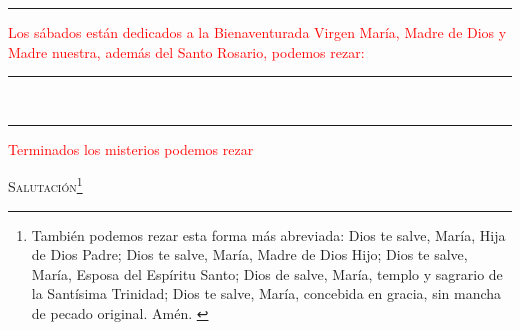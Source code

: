 \documentclass[10pt,twoside]{book}
\begin{document}
\begin{paracol}{2}
\begin{rightcolumn}
            
      \end{rightcolumn}

      \begin{leftcolumn*}
            

            
      \end{leftcolumn*}
      \begin{rightcolumn}
            

            
      \end{rightcolumn}
\end{paracol}

\iralfinal

\begin{center}
      {\rule{10em}{0.4pt}}

      \vspace{0.75em}

      \textcolor{red}{Los sábados están dedicados a la Bienaventurada Virgen María, Madre de Dios y Madre nuestra, 
      además del Santo Rosario, podemos rezar:}
\end{center}

\begin{multicols}{2}

      
      
\end{multicols}

\begin{center}
      \begin{spacing}{0.25}
            {\rule{20em}{0.4pt}}\\
            {\rule{20em}{0.4pt}}
      \end{spacing}
\end{center}

\vspace{-1em}
\label{final-prayer}
\begin{center}
      \textcolor{red}{Terminados los misterios podemos rezar}
      
      \vspace{1em}
      
      \textsc{Salutación}\footnote{También podemos rezar esta forma más abreviada: Dios te salve, María, Hija de Dios Padre; Dios te salve, María, Madre de Dios Hijo;
      Dios te salve, María, Esposa del Espíritu Santo; Dios de salve, María, templo y sagrario de la Santísima Trinidad; Dios te salve, María, concebida en gracia,
      sin mancha de pecado original. Amén. \cite{reyero}}
\end{center}
\end{document}
